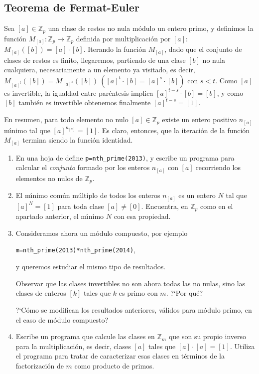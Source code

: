 \subsection{Teorema de Fermat-Euler}\label{peq}

Sea $[a]\in \mathbb{Z}_p$ una clase de restos no nula m\'odulo un entero primo,
y definimos la funci\'on $M_{[a]}:\mathbb{Z}_p\to \mathbb{Z}_p$ definida por
multiplicaci\'on por $[a]$: $M_{[a]}([b])=[a]\cdot[b]$. Iterando la funci\'on
$M_{[a]}$, dado que el conjunto de
clases de restos es finito, llegaremos, partiendo de una clase $[b]$ no nula 
cualquiera, necesariamente a un elemento ya visitado, es decir,
$M_{[a]^t}([b])=M_{[a]^s}([b])\  ([a]^t\cdot [b]=[a]^s\cdot [b])$ con $s<t$.
Como $[a]$ es invertible, la igualdad entre par\'entesis implica $[a]^{t-s}\cdot
[b]=[b]$, y como $[b]$ tambi\'en es invertible obtenemos finalmente
$[a]^{t-s}=[1].$

En resumen, para todo elemento no nulo $[a]\in \mathbb{Z}_p$ existe un entero
positivo $n_{[a]}$ m\'{\i}nimo tal que $[a]^{n_{[a]}}=[1].$ Es claro, entonces, 
que la iteraci\'on de la funci\'on $M_{[a]}$ termina siendo la funci\'on
identidad.

\begin{ejer}
\begin{enumerate}
 \item En una hoja de {\sage} define \lstinline|p=nth_prime(2013)|, y escribe un
programa para calcular el {\itshape conjunto} formado por los enteros 
$n_{[a]}$ con $[a]$ recorriendo los elementos no nulos de $\mathbb{Z}_p$. 

\item El m\'{\i}nimo com\'un m\'ultiplo de todos los enteros $n_{[a]}$ es un
entero $N$ tal que $[a]^N=[1]$ para toda clase $[a]\ne [0].$  Encuentra, en
$\mathbb{Z}_p$ como en el apartado anterior, el m\'{\i}nimo $N$ con esa
propiedad. 


\item Consideramos ahora  un m\'odulo compuesto, por ejemplo
\begin{center}
\lstinline|m=nth_prime(2013)*nth_prime(2014)|,
\end{center}
\noindent  y queremos estudiar el mismo tipo
de resultados.

Observar que las clases invertibles no son ahora todas las no nulas, 
sino las clases de enteros
$[k]$ tales que $k$ es primo con $m$. ?`Por qu\'e? 	

?`C\'omo se modifican los resultados  anteriores, v\'alidos para m\'odulo primo, en el
caso
de m\'odulo compuesto?

\item Escribe un programa que calcule las clases en $\mathbb{Z}_m$  que son
su propio inverso para la multiplicaci\'on, es decir, clases $[a]$ tales que
$[a]\cdot [a]=[1]$.  Utiliza el programa para tratar de caracterizar esas clases
en t\'erminos de la factorizaci\'on de $m$ como producto de primos.
\end{enumerate}
\end{ejer}

